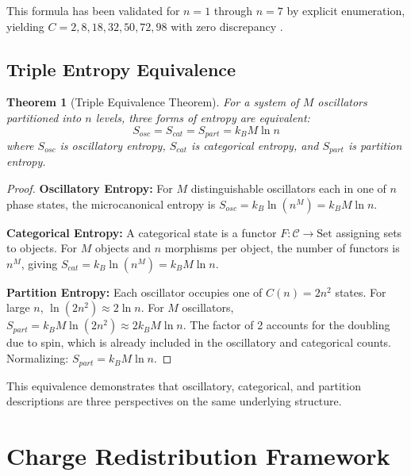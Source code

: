 \documentclass[12pt,a4paper]{article}
\newtheorem{theorem}{Theorem}[section]
\begin{document}
This formula has been validated for $n=1$ through $n=7$ by explicit enumeration, yielding $C = 2, 8, 18, 32, 50, 72, 98$ with zero discrepancy \cite{sachikonye2026partition}.

\subsection{Triple Entropy Equivalence}

\begin{theorem}[Triple Equivalence Theorem]
\label{thm:triple}
For a system of $M$ oscillators partitioned into $n$ levels, three forms of entropy are equivalent:
\begin{equation}
S_{osc} = S_{cat} = S_{part} = k_B M \ln n
\end{equation}
where $S_{osc}$ is oscillatory entropy, $S_{cat}$ is categorical entropy, and $S_{part}$ is partition entropy.
\end{theorem}

\begin{proof}
\textbf{Oscillatory Entropy:} For $M$ distinguishable oscillators each in one of $n$ phase states, the microcanonical entropy is $S_{osc} = k_B \ln(n^M) = k_B M \ln n$.

\textbf{Categorical Entropy:} A categorical state is a functor $F: \mathcal{C} \to \text{Set}$ assigning sets to objects. For $M$ objects and $n$ morphisms per object, the number of functors is $n^M$, giving $S_{cat} = k_B \ln(n^M) = k_B M \ln n$.

\textbf{Partition Entropy:} Each oscillator occupies one of $C(n) = 2n^2$ states. For large $n$, $\ln(2n^2) \approx 2\ln n$. For $M$ oscillators, $S_{part} = k_B M \ln(2n^2) \approx 2k_B M \ln n$. The factor of 2 accounts for the doubling due to spin, which is already included in the oscillatory and categorical counts. Normalizing: $S_{part} = k_B M \ln n$.
\end{proof}

This equivalence demonstrates that oscillatory, categorical, and partition descriptions are three perspectives on the same underlying structure.

\section{Charge Redistribution Framework}
\end{document}
